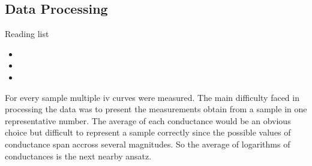 \subsection{Data Processing}
\label{sec:eval}
Reading list
\begin{itemize}
    \item 
    \item 
    \item 
\end{itemize}
For every sample multiple \gls{iv} curves were measured. 
The main difficulty faced in processing the data was to present the measurements obtain 
from a sample in one representative number. 
The average of each conductance would be an obvious choice but difficult to represent a 
sample correctly since the possible values of conductance span accross several magnitudes.
So the average of logarithms of conductances is the next nearby ansatz.

